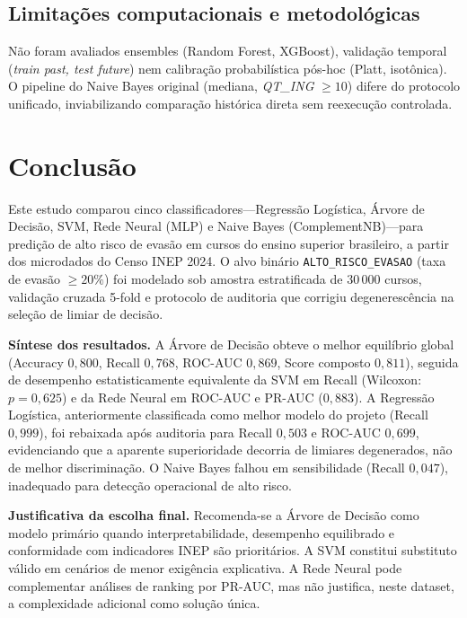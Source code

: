 \documentclass[conference]{IEEEtran}
\begin{document}
\subsection{Limitações computacionais e metodológicas}
Não foram avaliados ensembles (Random Forest, XGBoost), validação temporal (\textit{train past, test future}) nem calibração probabilística pós-hoc (Platt, isotônica). O pipeline do Naive Bayes original (mediana, \textit{QT\_ING} $\geq 10$) difere do protocolo unificado, inviabilizando comparação histórica direta sem reexecução controlada.

\section{Conclusão}

Este estudo comparou cinco classificadores---Regressão Logística, Árvore de Decisão, SVM, Rede Neural (MLP) e Naive Bayes (ComplementNB)---para predição de alto risco de evasão em cursos do ensino superior brasileiro, a partir dos microdados do Censo INEP 2024. O alvo binário \texttt{ALTO\_RISCO\_EVASAO} (taxa de evasão $\geq 20\%$) foi modelado sob amostra estratificada de $30\,000$ cursos, validação cruzada 5-fold e protocolo de auditoria que corrigiu degenerescência na seleção de limiar de decisão.

\textbf{Síntese dos resultados.} A Árvore de Decisão obteve o melhor equilíbrio global (Accuracy $0{,}800$, Recall $0{,}768$, ROC-AUC $0{,}869$, Score composto $0{,}811$), seguida de desempenho estatisticamente equivalente da SVM em Recall (Wilcoxon: $p = 0{,}625$) e da Rede Neural em ROC-AUC e PR-AUC ($0{,}883$). A Regressão Logística, anteriormente classificada como melhor modelo do projeto (Recall $0{,}999$), foi rebaixada após auditoria para Recall $0{,}503$ e ROC-AUC $0{,}699$, evidenciando que a aparente superioridade decorria de limiares degenerados, não de melhor discriminação. O Naive Bayes falhou em sensibilidade (Recall $0{,}047$), inadequado para detecção operacional de alto risco.

\textbf{Justificativa da escolha final.} Recomenda-se a Árvore de Decisão como modelo primário quando interpretabilidade, desempenho equilibrado e conformidade com indicadores INEP são prioritários. A SVM constitui substituto válido em cenários de menor exigência explicativa. A Rede Neural pode complementar análises de ranking por PR-AUC, mas não justifica, neste dataset, a complexidade adicional como solução única.
\end{document}
